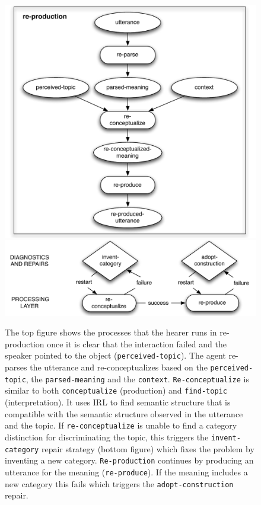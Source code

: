 \begin{figure}
\begin{center}
\includegraphics[width=0.75\columnwidth]{figs/task-re-production}
\includegraphics[width=0.75\columnwidth]{figs/diagnostics+repairs-adoption}
\end{center}
\caption[Re-production]{The top figure shows the processes that the hearer runs 
in {re-production} once it is clear that the interaction failed and 
the speaker pointed to the object ({\footnotesize\tt perceived-topic}). 
The agent {re-parses} the utterance and {re-conceptualizes} based on 
the {\footnotesize\tt perceived-topic}, the {\footnotesize\tt parsed-meaning} and the {\footnotesize\tt context}. 
{\footnotesize\tt Re-conceptualize} is similar to both {\footnotesize\tt conceptualize} (production) 
and {\footnotesize\tt find-topic} (interpretation). It uses IRL to find 
semantic structure that is compatible with the semantic structure
observed in the utterance and the topic. If 
{\footnotesize\tt re-conceptualize} is unable to find a category distinction 
for discriminating the topic, this
triggers the {\footnotesize\tt invent-category} repair strategy (bottom figure) 
which fixes the problem by 
inventing a new category. {\footnotesize\tt Re-production} continues by 
producing an utterance for the meaning ({\footnotesize\tt re-produce}). 
If the meaning includes a new category this fails 
which triggers the {\footnotesize\tt adopt-construction} repair.}
\label{f:re-production+diagnostics+repairs}
\end{figure}

